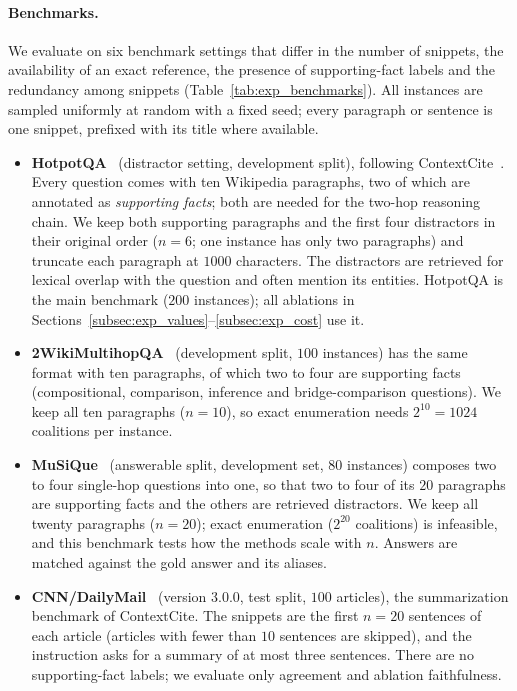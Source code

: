 \paragraph{Benchmarks.}
We evaluate on six benchmark settings that differ in the number of snippets, the availability of an exact reference, the presence of supporting-fact labels and the redundancy among snippets (Table~\ref{tab:exp_benchmarks}). All instances are sampled uniformly at random with a fixed seed; every paragraph or sentence is one snippet, prefixed with its title where available.
\begin{itemize}
    \item \textbf{HotpotQA}~\cite{yang2018hotpotqa} (distractor setting, development split), following ContextCite~\cite{cohen2024contextcite}. Every question comes with ten Wikipedia paragraphs, two of which are annotated as \emph{supporting facts}; both are needed for the two-hop reasoning chain. We keep both supporting paragraphs and the first four distractors in their original order ($n = 6$; one instance has only two paragraphs) and truncate each paragraph at $1000$ characters. The distractors are retrieved for lexical overlap with the question and often mention its entities. HotpotQA is the main benchmark ($200$ instances); all ablations in Sections~\ref{subsec:exp_values}--\ref{subsec:exp_cost} use it.
    \item \textbf{2WikiMultihopQA}~\cite{ho2020constructing} (development split, $100$ instances) has the same format with ten paragraphs, of which two to four are supporting facts (compositional, comparison, inference and bridge-comparison questions). We keep all ten paragraphs ($n = 10$), so exact enumeration needs $2^{10} = 1024$ coalitions per instance.
    \item \textbf{MuSiQue}~\cite{trivedi2022musique} (answerable split, development set, $80$ instances) composes two to four single-hop questions into one, so that two to four of its $20$ paragraphs are supporting facts and the others are retrieved distractors. We keep all twenty paragraphs ($n = 20$); exact enumeration ($2^{20}$ coalitions) is infeasible, and this benchmark tests how the methods scale with $n$. Answers are matched against the gold answer and its aliases.
    \item \textbf{CNN/DailyMail}~\cite{nallapati2016abstractive} (version 3.0.0, test split, $100$ articles), the summarization benchmark of ContextCite. The snippets are the first $n = 20$ sentences of each article (articles with fewer than $10$ sentences are skipped), and the instruction asks for a summary of at most three sentences. There are no supporting-fact labels; we evaluate only agreement and ablation faithfulness.

\end{itemize}

